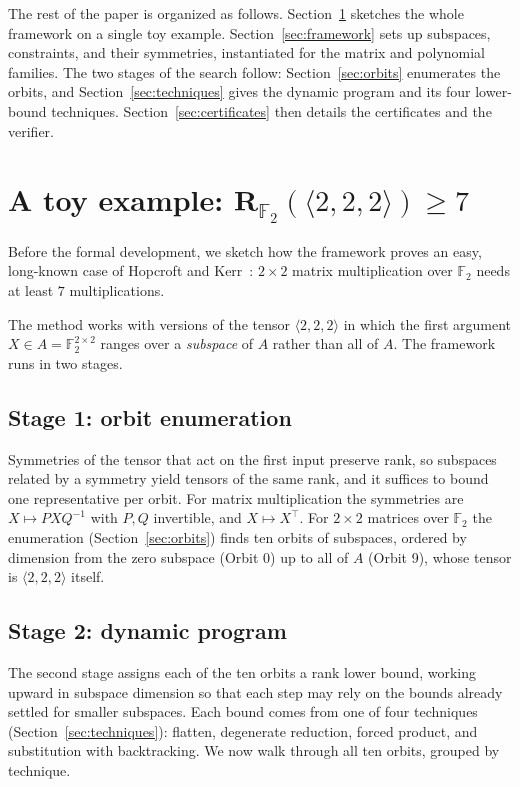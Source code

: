 \documentclass[11pt]{article}
\theoremstyle{definition}
\newcommand{\F}{\mathbb{F}}
\newcommand{\Rk}[2]{\mathbf{R}_{#1}(#2)}
\newcommand{\mmt}[3]{\langle #1,#2,#3\rangle}
\begin{document}
The rest of the paper is organized as follows. Section~\ref{sec:toy} sketches the
whole framework on a single toy example. Section~\ref{sec:framework} sets up
subspaces, constraints, and their symmetries, instantiated for the matrix and
polynomial families. The two stages of the search follow: Section~\ref{sec:orbits}
enumerates the orbits, and Section~\ref{sec:techniques} gives the dynamic program
and its four lower-bound techniques. Section~\ref{sec:certificates} then details the
certificates and the verifier.

\section{A toy example: \texorpdfstring{$\Rk{\F_2}{\mmt{2}{2}{2}}\ge 7$}{rank over F2 of <2,2,2> >= 7}}\label{sec:toy}

Before the formal development, we sketch how the framework proves an easy, long-known
case of Hopcroft and Kerr~\cite{hopcroft1971minimizing}:
$2\times 2$ matrix multiplication over $\F_2$ needs at
least $7$ multiplications.

The method works with versions of the tensor $\mmt{2}{2}{2}$ in which
the first argument $X\in A=\F_2^{2\times2}$ ranges over a
\emph{subspace} of $A$ rather than all of $A$.
The framework runs in two stages.

\subsection{Stage 1: orbit enumeration}

Symmetries of the tensor that act on the
first input preserve rank, so subspaces related by a symmetry yield
tensors of the same rank, and it suffices to bound one representative
per orbit. For matrix multiplication the symmetries are $X\mapsto PXQ^{-1}$ with
$P,Q$ invertible, and $X\mapsto X^{\top}$. For $2\times 2$ matrices over $\F_2$
the enumeration (Section~\ref{sec:orbits}) finds ten orbits of
subspaces, ordered by dimension from the zero subspace (Orbit 0) up
to all of $A$ (Orbit 9), whose tensor is $\mmt{2}{2}{2}$ itself.

\subsection{Stage 2: dynamic program}

The second stage assigns each of the ten
orbits a rank lower bound, working upward in subspace dimension so that
each step may rely on the bounds already settled for smaller subspaces. Each
bound comes from one of four techniques (Section~\ref{sec:techniques}): flatten,
degenerate reduction, forced product, and substitution with backtracking. We now
walk through all ten orbits, grouped by technique.
\end{document}
